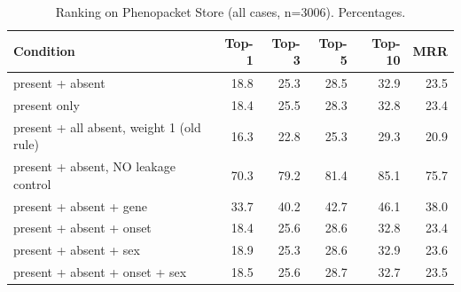 \begin{table}[t]
\centering\small
\begin{tabular}{lrrrrr}
\toprule
Condition & Top-1 & Top-3 & Top-5 & Top-10 & MRR \\
\midrule
present + absent & 18.8 & 25.3 & 28.5 & 32.9 & 23.5 \\
present only & 18.4 & 25.5 & 28.3 & 32.8 & 23.4 \\
present + all absent, weight 1 (old rule) & 16.3 & 22.8 & 25.3 & 29.3 & 20.9 \\
present + absent, NO leakage control & 70.3 & 79.2 & 81.4 & 85.1 & 75.7 \\
present + absent + gene & 33.7 & 40.2 & 42.7 & 46.1 & 38.0 \\
present + absent + onset & 18.4 & 25.6 & 28.6 & 32.8 & 23.4 \\
present + absent + sex & 18.9 & 25.3 & 28.6 & 32.9 & 23.6 \\
present + absent + onset + sex & 18.5 & 25.6 & 28.7 & 32.7 & 23.5 \\
\bottomrule
\end{tabular}
\caption{Ranking on Phenopacket Store (all cases, n=3006). Percentages.}
\label{tab:rank-full}
\end{table}
